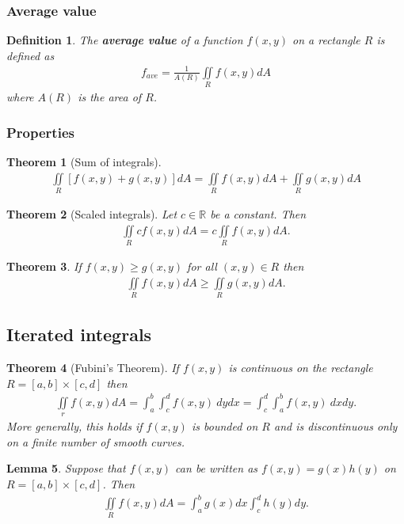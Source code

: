 \documentclass{article}
\theoremstyle{sltheorem}
\newtheorem{definition}{Definition}[section]
\newtheorem{theorem}{Theorem}[section]
\newtheorem{lemma}[theorem]{Lemma}
\newcommand{\R}{\mathbb{R}}
\newcommand{\di}{\iint\limits}
\newcommand*\B[1]{\textbf{#1}}
\begin{document}
\subsubsection{Average value}
\begin{definition}
    The \B{average value} of a function $f(x,y)$ on a rectangle $R$
    is defined as
    \begin{align*}
        f_{ave} = \frac{1}{A(R)}\di_R f(x,y)dA
    \end{align*}
    where $A(R)$ is the area of $R$.
\end{definition}
\subsubsection{Properties}
\begin{theorem}[Sum of integrals]
    \begin{align*}
        \di_R\left[f(x,y)+g(x,y)\right]dA = \di_R f(x,y)dA + \di_R g(x,y)dA
    \end{align*}
\end{theorem}
\begin{theorem}[Scaled integrals]
    Let $c\in\R$ be a constant. Then
    \begin{align*}
        \di_R cf(x,y)dA = c\di_R f(x,y)dA.
    \end{align*} 
\end{theorem}
\begin{theorem}
    If $f(x,y)\geq g(x,y)$ for all $(x,y)\in R$ then 
    \begin{align*}
        \di_R f(x,y)dA \geq \di_R g(x,y) dA.
    \end{align*}
\end{theorem}
\subsection{Iterated integrals}
\begin{theorem}[Fubini's Theorem]
    If $f(x,y)$ is continuous on the rectangle $R=[a,b]\times[c,d]$ then 
    \begin{align*}
        \di_r f(x,y)dA = \int_a^b \int_c^d f(x,y)\:dydx 
        = \int_c^d \int_a^b f(x,y)\:dxdy.
    \end{align*}
    More generally, this holds if $f(x,y)$ is bounded on $R$ and is
    discontinuous only on a finite number of smooth curves.
\end{theorem}
\begin{lemma}
    Suppose that $f(x,y)$ can be written as $f(x,y)=g(x)h(y)$ 
    on $R=[a,b]\times[c,d]$. Then
    \begin{align*}
        \di_R f(x,y)dA = \int_a^b g(x)dx \int_c^d h(y)dy.
    \end{align*}
\end{lemma}
\end{document}
